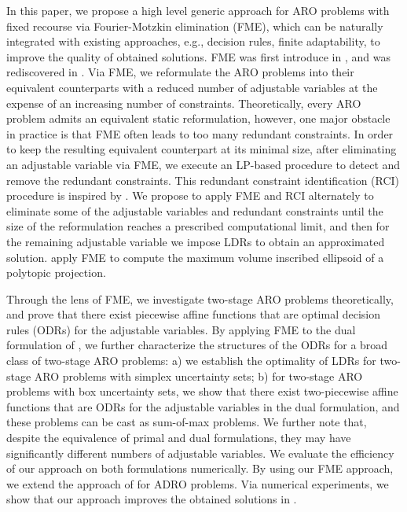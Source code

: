 \documentclass[fleqn,isre,blindrev]{informs4}
\begin{document}
	In this paper, we propose a high level generic approach for ARO problems with fixed recourse via Fourier-Motzkin elimination (FME), which can be naturally integrated with existing approaches, e.g., decision rules, finite adaptability, to improve the quality of obtained solutions. FME was first introduce in \cite{f26}, and was rediscovered in \cite{m36}. Via FME, we reformulate the ARO problems into their equivalent counterparts with  {a} reduced number of adjustable variables at the expense of an increasing number of constraints. Theoretically, every ARO problem admits an equivalent static reformulation, however, one major obstacle in practice is that FME often leads to too many redundant constraints. In order to keep the resulting equivalent counterpart at its minimal size, after eliminating an adjustable variable via FME, we execute an LP-based procedure to detect and remove  the redundant constraints. This redundant constraint identification (RCI) procedure is inspired by \cite{cmp89}. We propose to apply FME and RCI alternately to eliminate some of the adjustable variables and redundant constraints  {until} the size of the reformulation reaches a prescribed computational limit, and then for the remaining adjustable variable we impose LDRs to obtain an approximated solution. \cite{zd17b} apply FME to compute the maximum volume inscribed ellipsoid of a polytopic projection.
	
	Through the lens of FME, we investigate two-stage ARO problems theoretically, and prove that there exist piecewise affine functions that are optimal decision rules (ODRs) for the adjustable variables. By applying FME to the dual formulation of \cite{bd16}, we further characterize the structures of the ODRs for a broad class of two-stage ARO problems: a) we establish the optimality of LDRs for two-stage ARO problems with simplex uncertainty sets; b) for two-stage ARO problems with box uncertainty sets, we show that there exist two-piecewise affine functions that are ODRs for the adjustable variables in the dual formulation, and these problems can be  {cast} as sum-of-max problems. We further note that, despite the equivalence of primal and dual formulations, they may have significantly different  {numbers} of adjustable variables. We evaluate the efficiency of our approach on both  formulations numerically. By using our FME approach, we extend the approach of \cite{bsz17} for ADRO problems. Via numerical experiments,  we show that our approach improves the obtained solutions in \cite{bsz17}.
	
\end{document}
